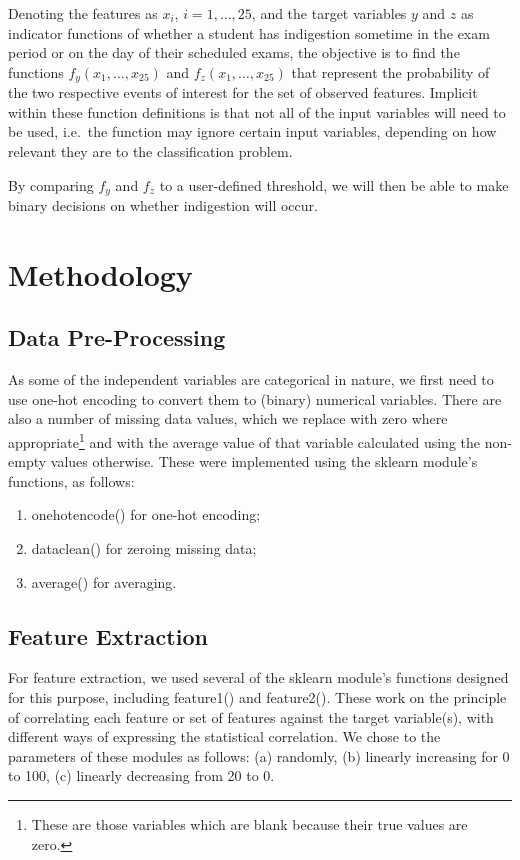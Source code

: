 \documentclass[12pt,a4paper]{article}
\begin{document}
	Denoting the features as $x_i$, $i = 1,\ldots,25$, and the target variables $y$ and $z$ as indicator functions of whether a student has indigestion sometime in the exam period or on the day of their scheduled exams, the objective is to find the functions $f_y(x_1,\ldots,x_{25})$ and $f_z(x_1,\ldots,x_{25})$ that represent the probability of the two respective events of interest for the set of observed features. Implicit within these function definitions is that not all of the input variables will need to be used, i.e.\ the function may ignore certain input variables, depending on how relevant they are to the classification problem.
	
	By comparing $f_y$ and $f_z$ to a user-defined threshold, we will then be able to make binary decisions on whether indigestion will occur.

	
	\section{Methodology}\label{sec:meth}
	\subsection{Data Pre-Processing}
	As some of the independent variables are categorical in nature, we first need to use one-hot encoding to convert them to (binary) numerical variables. There are also a number of missing data values, which we replace with zero where appropriate\footnote{These are those variables which are blank because their true values are zero.} and with the average value of that variable calculated using the non-empty values otherwise. These were implemented using the \textsf{sklearn} module's functions, as follows:
	\begin{enumerate}
		\item \textsf{onehotencode()} for one-hot encoding; 
		\item \textsf{dataclean()} for zeroing missing data;
		\item \textsf{average()} for averaging.
	\end{enumerate}
	
	\subsection{Feature Extraction}
	For feature extraction, we used several of the \textsf{sklearn} module's functions designed for this purpose, including \textsf{feature1()} and \textsf{feature2()}. These work on the principle of correlating each feature or set of features against the target variable(s), with different ways of expressing the statistical correlation. We chose to the parameters of these modules as follows: (a) randomly, (b) linearly increasing for 0 to 100, (c) linearly decreasing from 20 to 0.
	
\end{document}
